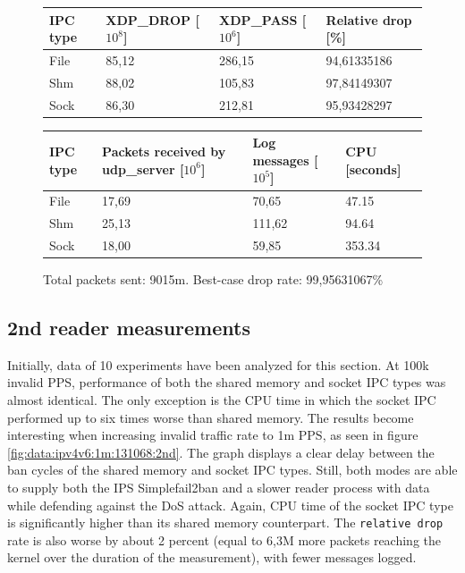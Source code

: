 \begin{figure}[!h]
	\centering
	\scriptsize
	\begin{tabular}{llll}
		\toprule
		\textbf{IPC type} & \textbf{XDP\_DROP [$10^8$]} & \textbf{XDP\_PASS [$10^6$]} & \textbf{Relative drop [\%]} \\ \midrule 
		File & 85,12 & 286,15 & 94,61335186 \\
        Shm & 88,02 & 105,83 & 97,84149307 \\
        Sock & 86,30 & 212,81 & 95,93428297 \\
	\bottomrule
	\end{tabular}
    \begin{tabular}{llll}
		\toprule
		\textbf{IPC type} & \textbf{Packets received by udp\_server [$10^6$]} & \textbf{Log messages [$10^5$]} & \textbf{CPU [seconds]} \\ \midrule 
		File & 17,69 & 70,65 & 47.15 \\
        Shm & 25,13 & 111,62 & 94.64 \\
        Sock & 18,00 & 59,85 & 353.34 \\
	\bottomrule
	\end{tabular}
	\caption[Simplefail2ban, IPv4v6, 30m \ac{PPS}, 131068 malicious clients]{Total packets sent: 9015m. Best-case drop rate: 99,95631067\%}
	\label{fig:data:ipv4v6:30m:131068}
\end{figure}

\subsection{2nd reader measurements}
Initially, data of 10 experiments have been analyzed for this section.
At 100k invalid \ac{PPS}, performance of both the shared memory and socket \ac{IPC} types was almost identical.
The only exception is the \ac{CPU} time in which the socket \ac{IPC} performed up to six times worse than shared memory.
The results become interesting when increasing invalid traffic rate to 1m \ac{PPS}, as seen in figure \ref{fig:data:ipv4v6:1m:131068:2nd}.
The graph displays a clear delay between the ban cycles of the shared memory and socket \ac{IPC} types.
Still, both modes are able to supply both the \ac{IPS} Simplefail2ban and a slower reader process with data while defending against the \ac{DoS} attack.
Again, \ac{CPU} time of the socket \ac{IPC} type is significantly higher than its shared memory counterpart.
The \texttt{relative drop} rate is also worse by about 2 percent (equal to 6,3M more packets reaching the kernel over the duration of the measurement), with fewer messages logged.


